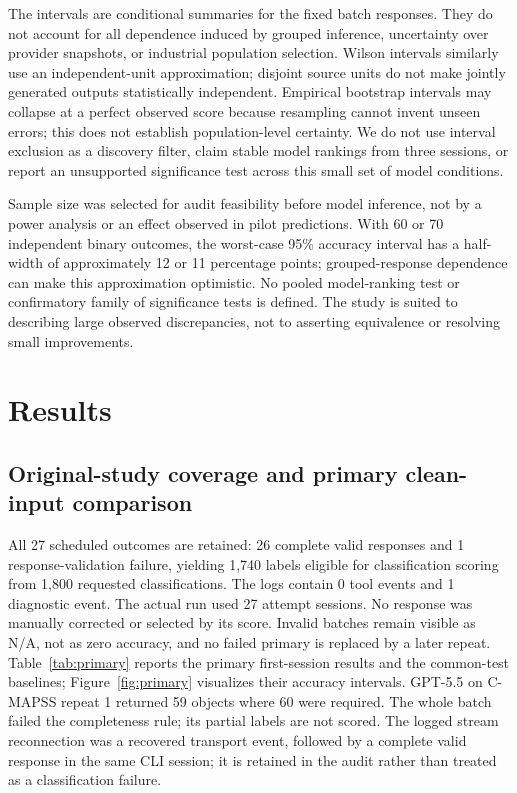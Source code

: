 \documentclass[11pt,a4paper]{article}
\begin{document}
The intervals are conditional summaries for the fixed batch responses. They do not account for all dependence induced by grouped inference, uncertainty over provider snapshots, or industrial population selection. Wilson intervals similarly use an independent-unit approximation; disjoint source units do not make jointly generated outputs statistically independent. Empirical bootstrap intervals may collapse at a perfect observed score because resampling cannot invent unseen errors; this does not establish population-level certainty. We do not use interval exclusion as a discovery filter, claim stable model rankings from three sessions, or report an unsupported significance test across this small set of model conditions.

Sample size was selected for audit feasibility before model inference, not by a power analysis or an effect observed in pilot predictions. With 60 or 70 independent binary outcomes, the worst-case 95\% accuracy interval has a half-width of approximately 12 or 11 percentage points; grouped-response dependence can make this approximation optimistic. No pooled model-ranking test or confirmatory family of significance tests is defined. The study is suited to describing large observed discrepancies, not to asserting equivalence or resolving small improvements.

\section{Results}
\subsection{Original-study coverage and primary clean-input comparison}
All 27 scheduled outcomes are retained: 26 complete valid responses and 1 response-validation failure, yielding 1,740 labels eligible for classification scoring from 1,800 requested classifications. The logs contain 0 tool events and 1 diagnostic event. The actual run used 27 attempt sessions. No response was manually corrected or selected by its score. Invalid batches remain visible as N/A, not as zero accuracy, and no failed primary is replaced by a later repeat. Table~\ref{tab:primary} reports the primary first-session results and the common-test baselines; Figure~\ref{fig:primary} visualizes their accuracy intervals. GPT-5.5 on C-MAPSS repeat 1 returned 59 objects where 60 were required. The whole batch failed the completeness rule; its partial labels are not scored. The logged stream reconnection was a recovered transport event, followed by a complete valid response in the same CLI session; it is retained in the audit rather than treated as a classification failure.
\end{document}
